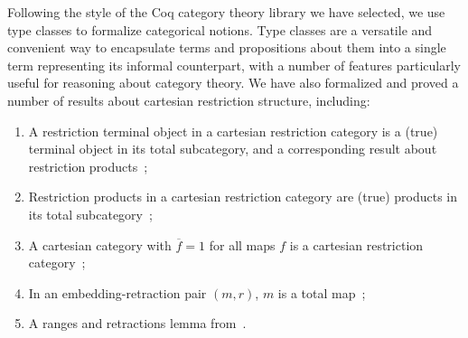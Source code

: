 \documentclass{entcs} \usepackage{entcsmacro}
\begin{document}
Following the style of the Coq category theory library we have
selected, we use type classes to formalize categorical notions.
Type classes are a versatile and convenient way to encapsulate terms and propositions about them into a single term representing its informal counterpart, with a number of features particularly useful for reasoning about category theory. We have also formalized and proved a number of results about cartesian restriction structure, including: 

\begin{enumerate}
	\item A restriction terminal object in a cartesian restriction category is a (true) terminal object in its total subcategory, and a corresponding result about restriction products~\cite{Turing};
	
	\item Restriction products in a cartesian restriction category are (true) products in its total subcategory~\cite{Turing};
	
	\item A cartesian category with $\overline{f} = 1$ for all maps $f$ is a cartesian restriction category~\cite{Turing};
	
	\item In an embedding-retraction pair $(m, r)$, $m$ is a total map~\cite{Restriction};
	
	\item A ranges and retractions lemma from~\cite{MyThesis}.
\end{enumerate}

\end{document}
